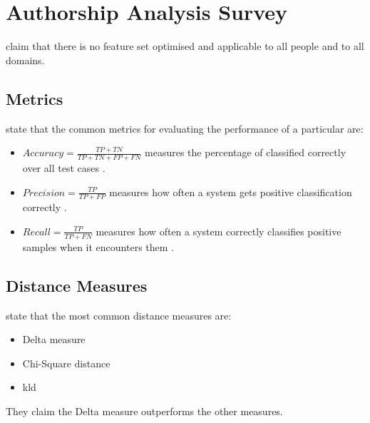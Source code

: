 \section{Authorship Analysis Survey}
\label{sec:authorship_analysis_survey}

\citet{elmanarelbouanani_authorship_2014} claim that there is no feature set optimised and applicable to all people and to all domains.

\subsection{Metrics}
\citet{elmanarelbouanani_authorship_2014} state that the common metrics for evaluating the performance of a particular are:
\begin{itemize}
    \item $Accuracy = \frac{TP + TN}{TP + TN + FP + FN}$ \citep{elmanarelbouanani_authorship_2014,neal_surveying_2018} 
    measures the percentage of classified correctly over all test cases \citep{neal_surveying_2018}.

    \item $Precision = \frac{TP}{TP + FP}$ \citep{elmanarelbouanani_authorship_2014,neal_surveying_2018} 
    measures how often a system gets positive classification correctly \citep{neal_surveying_2018}.

    \item $Recall = \frac{TP}{TP + FN}$ \citep{elmanarelbouanani_authorship_2014,neal_surveying_2018} 
    measures how often a system correctly classifies positive samples when it encounters them \citep{neal_surveying_2018}.
\end{itemize}


\subsection{Distance Measures}
\citet{elmanarelbouanani_authorship_2014} state that the most common distance measures are:
\begin{itemize}
    \item Delta measure
    \item Chi-Square distance
    \item \ac{kld}
\end{itemize}
They claim the Delta measure outperforms the other measures.